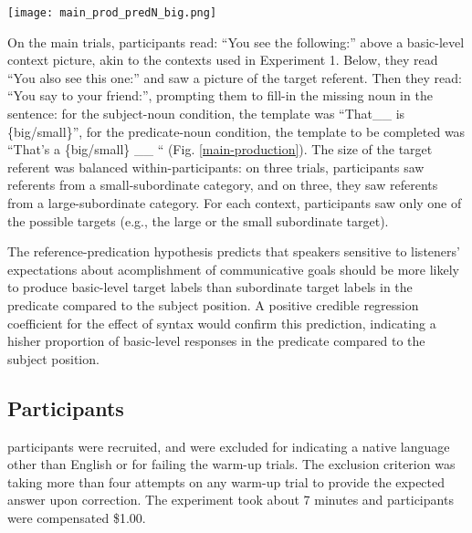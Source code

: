 \begin{figure*}[t]
	\begin{center}
		\texttt{[image: main\_prod\_predN\_big.png]}
	\end{center}
	\caption{Example view of the noun production main trial: Participants fill-in the noun in the predicate position of a sentence describing a large-subordinate target.}
	\label{main-production}
\end{figure*}
On the main trials, participants read: “You see the following:” above a basic-level context picture, akin to the contexts used in Experiment 1. Below, they read “You also see this one:” and saw a picture of the target referent. Then they read: “You say to your friend:”, prompting them to fill-in the missing noun in the sentence: for the subject-noun condition, the template was “That\_\_ is \{big/small\}”, for the predicate-noun condition, the template to be completed was “That’s a \{big/small\} \_\_ “ (Fig. \ref{main-production}).  
The size of the target referent was balanced within-participants: on three trials, participants saw referents from a small-subordinate category, and on three, they saw referents from a large-subordinate category. For each context, participants saw only one of the possible targets (e.g., the large or the small subordinate target).

The reference-predication hypothesis predicts that speakers sensitive to listeners' expectations about acomplishment of communicative goals should be more likely to produce basic-level target labels than subordinate target labels in the predicate compared to the subject position. A positive credible regression coefficient for the effect of syntax would confirm this prediction, indicating a hisher proportion of basic-level responses in the predicate compared to the subject position. 

\subsection{Participants}
  participants were recruited, and   were excluded for indicating a native language other than English or for failing the warm-up trials. The exclusion criterion was taking more than four attempts on any warm-up trial to provide the expected answer upon correction. The experiment took about 7 minutes and participants were compensated \$1.00. 
 
